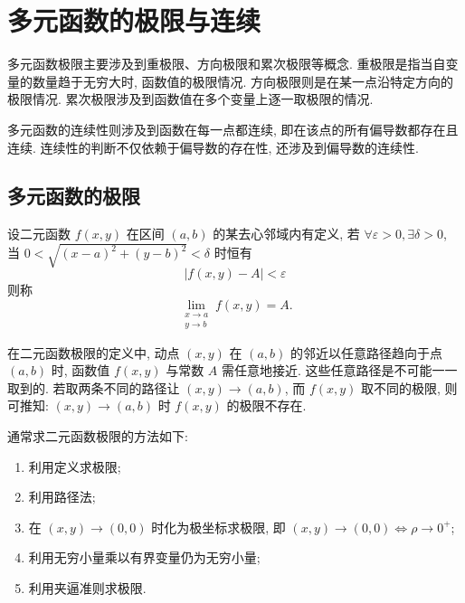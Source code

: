 \section{多元函数的极限与连续}

多元函数极限主要涉及到重极限、方向极限和累次极限等概念. 重极限是指当自变量的数量趋于无穷大时, 函数值的极限情况. 方向极限则是在某一点沿特定方向的极限情况. 累次极限涉及到函数值在多个变量上逐一取极限的情况.

多元函数的连续性则涉及到函数在每一点都连续, 即在该点的所有偏导数都存在且连续. 连续性的判断不仅依赖于偏导数的存在性, 还涉及到偏导数的连续性.

\subsection{多元函数的极限}

\begin{definition}[二元函数的极限]
    设二元函数 $ f(x, y) $ 在区间 $ (a, b) $ 的某去心邻域内有定义,
    若 $ \forall \varepsilon>0, \exists \delta>0 $, 当 $ 0<\sqrt{(x-a)^{2}+(y-b)^{2}}<\delta $ 时恒有
    $$|f(x, y)-A|<\varepsilon$$
    则称
    $$\lim _{\substack{x \to a \\ y \to b}} f(x, y)=A.$$
\end{definition}

在二元函数极限的定义中, 动点 $ (x, y) $ 在 $ (a, b) $ 的邻近以任意路径趋向于点 $ (a, b) $ 时, 函数值 $ f(x, y) $ 与常数 $ A $ 需任意地接近.
这些任意路径是不可能一一取到的. 若取两条不同的路径让 $ (x, y) \to(a, b) $, 而 $ f(x, y) $ 取不同的极限,
则可推知: $ (x, y) \to(a, b) $ 时 $ f(x, y) $ 的极限不存在.

通常求二元函数极限的方法如下:
\begin{enumerate}[label=(\arabic{*})]
    \item 利用定义求极限;
    \item 利用路径法;
    \item 在 $ (x, y) \to(0,0) $ 时化为极坐标求极限, 即 $ (x, y) \to(0,0) \Leftrightarrow \rho \to 0^+ $;
    \item 利用无穷小量乘以有界变量仍为无穷小量;
    \item 利用夹逼准则求极限.
\end{enumerate}

